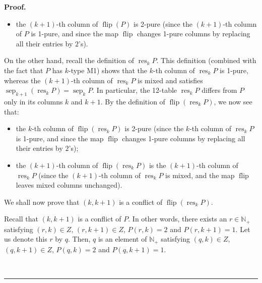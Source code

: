 \documentclass[numbers=enddot,12pt,final,onecolumn,notitlepage]{scrartcl}%
\theoremstyle{definition}
\newenvironment{proof}[1][Proof]{\noindent\textbf{#1.} }{\ \rule{0.5em}{0.5em}}
\begin{document}
\begin{proof}
\begin{itemize}
\item the $\left(  k+1\right)  $-th column of $\operatorname*{flip}\left(
P\right)  $ is 2-pure (since the $\left(  k+1\right)  $-th column of $P$ is
1-pure, and since the map $\operatorname*{flip}$ changes 1-pure columns by
replacing all their entries by $2$'s).
\end{itemize}

On the other hand, recall the definition of $\operatorname*{res}%
\nolimits_{k}P$. This definition (combined with the fact that $P$ has $k$-type
M1) shows that the $k$-th column of $\operatorname*{res}_{k}P$ is 1-pure,
whereas the $\left(  k+1\right)  $-th column of $\operatorname*{res}%
\nolimits_{k}P$ is mixed and satisfies $\operatorname*{sep}\nolimits_{k+1}%
\left(  \operatorname*{res}\nolimits_{k}P\right)  =\operatorname*{sep}%
\nolimits_{k}P$. In particular, the 12-table $\operatorname*{res}%
\nolimits_{k}P$ differs from $P$ only in its columns $k$ and $k+1$. By the
definition of $\operatorname*{flip}\left(  \operatorname*{res}\nolimits_{k}%
P\right)  $, we now see that:

\begin{itemize}
\item the $k$-th column of $\operatorname*{flip}\left(  \operatorname*{res}%
\nolimits_{k}P\right)  $ is 2-pure (since the $k$-th column of
$\operatorname*{res}\nolimits_{k}P$ is 1-pure, and since the map
$\operatorname*{flip}$ changes 1-pure columns by replacing all their entries
by $2$'s);

\item the $\left(  k+1\right)  $-th column of $\operatorname*{flip}\left(
\operatorname*{res}\nolimits_{k}P\right)  $ is the $\left(  k+1\right)  $-th
column of $\operatorname*{res}\nolimits_{k}P$ (since the $\left(  k+1\right)
$-th column of $\operatorname*{res}\nolimits_{k}P$ is mixed, and the map
$\operatorname*{flip}$ leaves mixed columns unchanged).
\end{itemize}

We shall now prove that $\left(  k,k+1\right)  $ is a conflict of
$\operatorname*{flip}\left(  \operatorname*{res}\nolimits_{k}P\right)  $.

Recall that $\left(  k,k+1\right)  $ is a conflict of $P$. In other words,
there exists an $r\in\mathbb{N}_{+}$ satisfying $\left(  r,k\right)  \in Z$,
$\left(  r,k+1\right)  \in Z$, $P\left(  r,k\right)  =2$ and $P\left(
r,k+1\right)  =1$. Let us denote this $r$ by $q$. Then, $q$ is an element of
$\mathbb{N}_{+}$ satisfying $\left(  q,k\right)  \in Z$, $\left(
q,k+1\right)  \in Z$, $P\left(  q,k\right)  =2$ and $P\left(  q,k+1\right)
=1$.


\end{proof}
\end{document}
